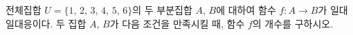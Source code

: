 전체집합 $U=\{1,\,2,\,3,\,4,\,5,\,6\}$의 두 부분집합 $A$, $B$에 대하여 함수 $f:A\longrightarrow B$가 일대일대응이다. 두 집합 $A$, $B$가 다음 조건을 만족시킬 때, 함수 $f$의 개수를 구하시오. 

